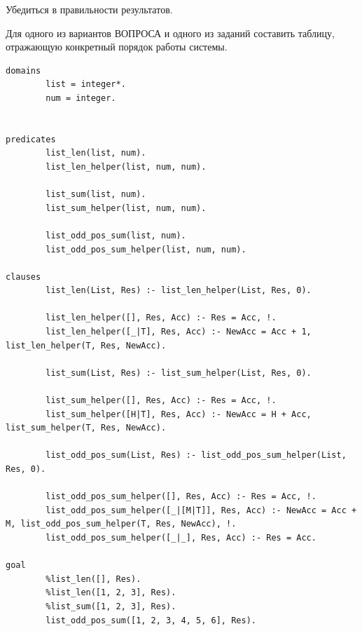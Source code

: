 \documentclass[12pt,a4paper]{scrreprt}
\begin{document}
Убедиться в правильности результатов.

Для одного из вариантов ВОПРОСА и одного из заданий составить таблицу, отражающую конкретный порядок работы системы.

\begin{lstlisting}
domains
		list = integer*.
		num = integer.
	
	
predicates
		list_len(list, num).
		list_len_helper(list, num, num).
		
		list_sum(list, num).
		list_sum_helper(list, num, num).
		
		list_odd_pos_sum(list, num).
		list_odd_pos_sum_helper(list, num, num).
	
clauses
		list_len(List, Res) :- list_len_helper(List, Res, 0).
		
		list_len_helper([], Res, Acc) :- Res = Acc, !.
		list_len_helper([_|T], Res, Acc) :- NewAcc = Acc + 1, list_len_helper(T, Res, NewAcc).
		
		list_sum(List, Res) :- list_sum_helper(List, Res, 0).
		
		list_sum_helper([], Res, Acc) :- Res = Acc, !.
		list_sum_helper([H|T], Res, Acc) :- NewAcc = H + Acc, list_sum_helper(T, Res, NewAcc).
		
		list_odd_pos_sum(List, Res) :- list_odd_pos_sum_helper(List, Res, 0).
		
		list_odd_pos_sum_helper([], Res, Acc) :- Res = Acc, !.
		list_odd_pos_sum_helper([_|[M|T]], Res, Acc) :- NewAcc = Acc + M, list_odd_pos_sum_helper(T, Res, NewAcc), !.
		list_odd_pos_sum_helper([_|_], Res, Acc) :- Res = Acc.
	
goal
		%list_len([], Res).
		%list_len([1, 2, 3], Res).
		%list_sum([1, 2, 3], Res).
		list_odd_pos_sum([1, 2, 3, 4, 5, 6], Res).
\end{lstlisting}
	
\end{document}
